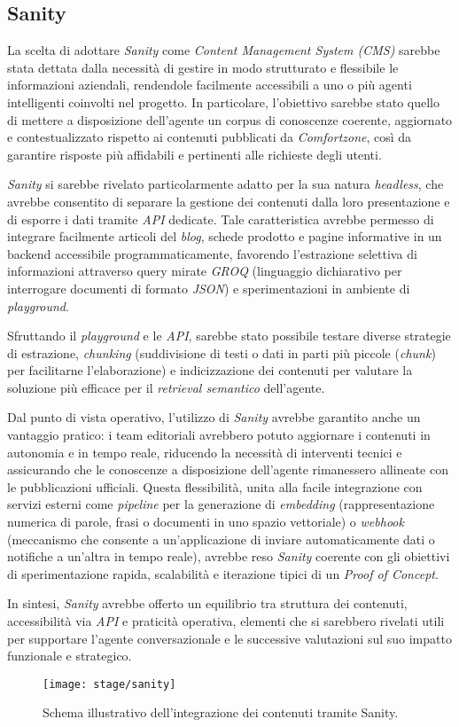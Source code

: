 \subsection{Sanity}

La scelta di adottare \emph{Sanity} come \emph{Content Management System (CMS)} sarebbe stata dettata dalla necessità di gestire in modo strutturato e flessibile le informazioni aziendali, 
rendendole facilmente accessibili a uno o più agenti intelligenti coinvolti nel progetto. 
In particolare, l’obiettivo sarebbe stato quello di mettere a disposizione dell’agente un corpus di conoscenze coerente, aggiornato e contestualizzato rispetto ai 
contenuti pubblicati da \emph{Comfortzone}, così da garantire risposte più affidabili e pertinenti alle richieste degli utenti.

\emph{Sanity} si sarebbe rivelato particolarmente adatto per la sua natura \emph{headless}, che avrebbe consentito di separare la gestione dei contenuti dalla loro 
presentazione e di esporre i dati tramite \emph{API} dedicate. Tale caratteristica avrebbe permesso di integrare facilmente articoli del \emph{blog}, 
schede prodotto e pagine informative in un backend accessibile programmaticamente, favorendo l’estrazione selettiva di informazioni attraverso query mirate \emph{GROQ} (linguaggio dichiarativo per interrogare documenti di formato \emph{JSON}) e 
sperimentazioni in ambiente di \emph{playground}.

Sfruttando il \emph{playground} e le \emph{API}, sarebbe stato possibile testare diverse strategie di estrazione, \emph{chunking} (suddivisione di testi o dati in parti più piccole (\emph{chunk}) per facilitarne l’elaborazione) e indicizzazione dei contenuti per valutare la soluzione più 
efficace per il \emph{retrieval semantico} dell’agente.

Dal punto di vista operativo, l’utilizzo di \emph{Sanity} avrebbe garantito anche un vantaggio pratico: i team editoriali avrebbero potuto aggiornare i contenuti in autonomia e in tempo reale, 
riducendo la necessità di interventi tecnici e assicurando che le conoscenze a disposizione dell’agente rimanessero allineate con le pubblicazioni ufficiali. Questa flessibilità, 
unita alla facile integrazione con servizi esterni come \emph{pipeline} per la generazione di \emph{embedding} (rappresentazione numerica di parole, frasi o documenti in uno spazio vettoriale) o \emph{webhook} (meccanismo che consente a un’applicazione di inviare automaticamente dati o notifiche a un’altra in tempo reale), avrebbe reso \emph{Sanity} 
coerente con gli obiettivi di sperimentazione rapida, scalabilità e iterazione tipici di un \emph{Proof of Concept}.

In sintesi, \emph{Sanity} avrebbe offerto un equilibrio tra struttura dei contenuti, accessibilità via \emph{API} e praticità operativa, elementi che si sarebbero rivelati 
utili per supportare l’agente conversazionale e le successive valutazioni sul suo impatto funzionale e strategico.

\begin{figure}[H]
    \centering
    \texttt{[image: stage/sanity]}
    \caption{Schema illustrativo dell’integrazione dei contenuti tramite Sanity.}
    \label{fig:sanity}
\end{figure}